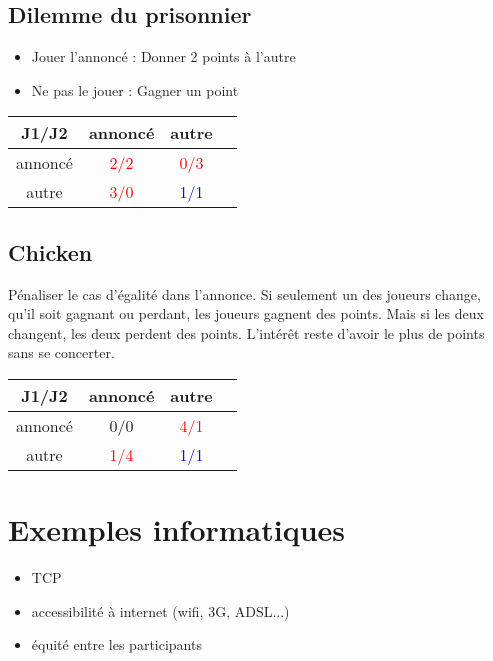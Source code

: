 \documentclass{article}
\begin{document}
\subsection{Dilemme du prisonnier}

\begin{itemize}
    \item Jouer l'annoncé : Donner 2 points à l'autre
    \item Ne pas le jouer : Gagner un point
\end{itemize}

\begin{tabular}{c|c|c|c}
    J1/J2 & annoncé & autre  \\ \hline
    annoncé & \textcolor{red}{2/2} & \textcolor{red}{0/3}  \\ \hline
    autre & \textcolor{red}{3/0} & \textcolor{blue}{1/1} \\ \hline 
\end{tabular}

\subsection{Chicken}
Pénaliser le cas d'égalité dans l'annonce.
Si seulement un des joueurs change, qu'il soit gagnant ou perdant, les joueurs gagnent des points. Mais si les deux changent, les deux perdent des points. L'intérêt reste d'avoir le plus de points sans se concerter.

\begin{tabular}{c|c|c|c}
    J1/J2 & annoncé & autre  \\ \hline
    annoncé & {0/0} & \textcolor{red}{4/1}  \\ \hline
    autre & \textcolor{red}{1/4} & \textcolor{blue}{1/1} \\ \hline 
\end{tabular}

\section{Exemples informatiques}

\begin{itemize}
    \item TCP
    \item accessibilité à internet (wifi, 3G, ADSL...)
    \item équité entre les participants
\end{itemize}
\end{document}

